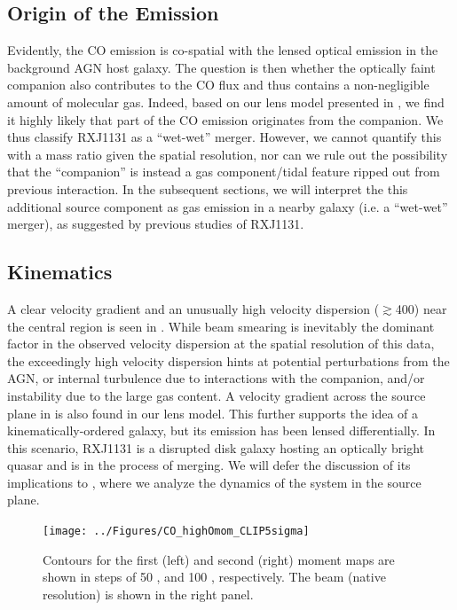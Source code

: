 \documentclass[]{emulateapj}
\begin{document}
\subsection{Origin of the \bco Emission} \label{sec:origin} %
Evidently, the CO emission is co-spatial with the lensed optical emission in
the background AGN host galaxy.
The question is then whether the optically
faint companion also contributes to the CO flux and thus contains a
non-negligible amount of molecular gas.
Indeed, based on our lens model presented in , we find it
highly likely that part of the CO emission originates from
the companion. We thus classify RXJ1131 as a ``wet-wet'' merger.
However, we cannot quantify this with a mass ratio given the
spatial resolution, nor can we rule out the possibility that
the ``companion'' is instead a gas component/tidal feature ripped out
from previous interaction.
In the subsequent sections, we will interpret
the this additional source component as gas emission
in a nearby galaxy (i.e. a ``wet-wet'' merger), as suggested by previous studies of RXJ1131.

\subsection{\bco Kinematics} %
A clear velocity gradient and an unusually high
velocity dispersion ($\gtrsim$400\kms) near the central region
is seen in . While beam smearing is inevitably the
dominant factor in the observed velocity dispersion
at the spatial resolution of this data, the exceedingly
high velocity dispersion hints
at potential perturbations from the AGN, or internal turbulence due to
interactions with the companion, and/or instability due to the large gas
content. A velocity gradient across the source plane in  is also
found in our lens model. This further supports the idea of a
kinematically-ordered galaxy, but its emission has been lensed differentially.
In this scenario, RXJ1131 is a disrupted disk galaxy hosting an optically
bright quasar and is in the process of merging.
We will defer the discussion of its implications to ,
where we analyze the dynamics of the system in the source plane.

\begin{figure}[!htbp]
\centering
\texttt{[image: ../Figures/CO\_highOmom\_CLIP5sigma]}
\caption{
Contours for the first (left) and second (right) moment maps are shown in steps of
50 \kms, and 100 \kms, respectively. The beam (native resolution) is shown in the right panel.
\label{fig:CO21highO}}
\end{figure}
\end{document}
